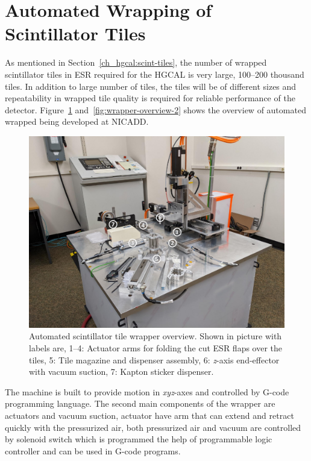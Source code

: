 \clearpage
\section{
  Automated Wrapping of Scintillator Tiles
 }\label{ch_hgcal:wrapping}

As mentioned in Section~\ref{ch_hgcal:scint-tiles}, the number
of wrapped scintillator tiles in \gls{ESR} required for the \gls{HGCAL}
is very large, 100--200 thousand tiles. In addition to large number
of tiles, the tiles will be of different sizes and repeatability
in wrapped tile quality is required for reliable performance
of the detector. Figure~\ref{fig:wrapper-overview-1} and~\ref{fig:wrapper-overview-2}
shows the overview
of automated wrapped being developed at \gls{NICADD}.

\begin{figure}[!ht]
  \centering
  \includegraphics[width=\textwidth,page=1]{figures/wrapper_machine_pics.pdf}
  \caption[Automated scintillator tile wrapper overview]
  {Automated scintillator tile wrapper overview. Shown in picture with labels are,
    1--4: Actuator arms for folding the cut ESR flaps over the tiles,
    5: Tile magazine and dispenser assembly, 6: \textit{z}-axis end-effector
    with vacuum suction, 7: Kapton sticker dispenser.}%
  \label{fig:wrapper-overview-1}
\end{figure}

The machine is built to provide motion in \textit{xyz}-axes
and controlled by G-code programming language.
The second main components of the wrapper are actuators and vacuum
suction, actuator have arm that can extend and retract quickly with the
pressurized air, both pressurized air and vacuum are controlled
by solenoid switch which is programmed the help
of programmable logic controller and can be used in G-code programs.

